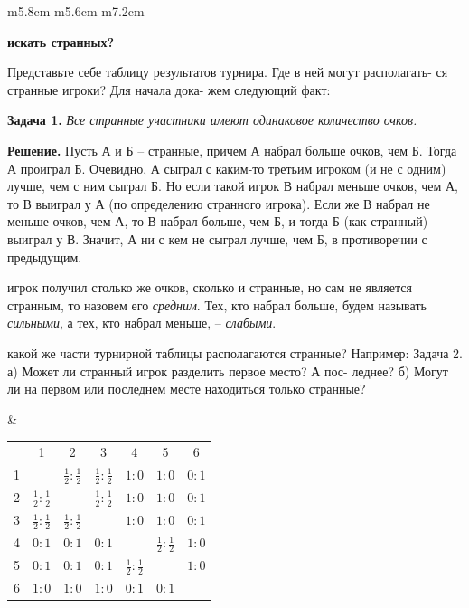 \documentclass[10pt,onecolumn,a4paper]{article}
\begin{document}
\begin{tabular}{  m{5.8cm}  m{5.6cm} m{7.2cm}}
{\begin{center}
    \textbf{ искать странных?}
\end{center}

Представьте себе таблицу результатов турнира. Где в ней могут располагать- ся странные игроки? Для начала дока- жем следующий факт:

\quad\textbf{Задача 1.} \textit{Все странные участники имеют одинаковое количество очков.}

\quad\textbf{Решение.} Пусть А и Б – странные, причем А набрал больше очков, чем Б. Тогда А проиграл Б. Очевидно, А сыграл с каким-то третьим игроком (и не с одним) лучше, чем с ним сыграл Б. Но если такой игрок В набрал меньше очков, чем А, то В выиграл у А (по определению странного игрока). Если же В набрал не меньше очков, чем А, то В набрал больше, чем Б, и тогда Б (как странный) выиграл у В. Значит, А ни с кем не сыграл лучше, чем Б, в противоречии с предыдущим.

 игрок получил столько же очков, сколько и странные, но сам не является странным, то назовем его \textit{средним}. Тех, кто набрал больше, будем называть \textit{сильными}, а тех, кто набрал меньше, – \textit{слабыми}.

 какой же части турнирной таблицы располагаются странные? Например:
Задача 2. а) Может ли странный игрок разделить первое место? А пос- леднее?
б) Могут ли на первом или последнем месте находиться только странные?
}



&
\normalsize{
\begin{center}
\begin{tabular}{ c | c | c | c | c | c | c | }

 \multicolumn{1}{c}{}& \multicolumn{1}{c}{1} & \multicolumn{1}{c}{2} & \multicolumn{1}{c}{3} & \multicolumn{1}{c}{4} & \multicolumn{1}{c}{5} & \multicolumn{1}{c}{6} \\
 \cline{2-7}
 1 &\cellcolor[gray]{0.8} & $\frac{1}{2}:\frac{1}{2}$ & $\frac{1}{2}:\frac{1}{2}$ & $1:0$ & $1:0$ & $0:1$ \\[1ex]
 \cline{2-7}
 2& $\frac{1}{2}:\frac{1}{2}$ &\cellcolor[gray]{0.8} & $\frac{1}{2}:\frac{1}{2}$ & $1:0$ & $1:0$ & $0:1$ \\[1ex]
 \cline{2-7}
 3 & $\frac{1}{2}:\frac{1}{2}$ & $\frac{1}{2}:\frac{1}{2}$ &\cellcolor[gray]{0.8} & $1:0$ & $1:0$ & $0:1$ \\[1ex]
 \cline{2-7}
 4& $0:1$ & $0:1$ & $0:1$ & \cellcolor[gray]{0.8} & $\frac{1}{2}:\frac{1}{2}$ & $1:0$ \\ [1ex]
 \cline{2-7}
 5 &  $0:1$ &  $0:1$ &  $0:1$ & $\frac{1}{2}:\frac{1}{2}$ & \cellcolor[gray]{0.8}& $1:0$\\[1ex]
 \cline{2-7}
 6 & $1:0$ & $1:0$ & $1:0$ & $0:1$ & $0:1$ &\cellcolor[gray]{0.8} \\[1ex]
 \cline{2-7}


\end{tabular}
\end{center}}
\end{tabular}
\end{document}
